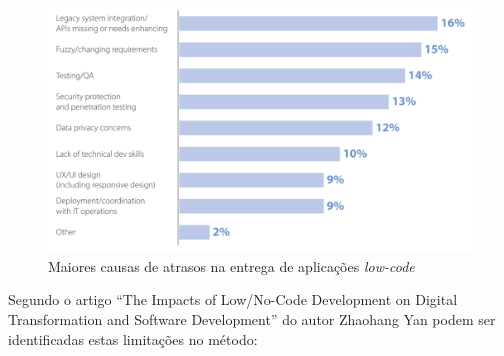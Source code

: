             \begin{figure}[htbp]
                \centering
                \includegraphics[width=\textwidth]{imgs/causas_espera_na_entrega_aplicacoes_low_code.png}
                    \caption{Maiores causas de atrasos na entrega de aplicações \textit{low-code}}\label{fig:atraso_app_low_code}
            \end{figure}
            
            Segundo o artigo ``The Impacts of Low/No-Code Development on Digital Transformation and Software Development'' do autor Zhaohang Yan podem ser identificadas estas limitações no método:

